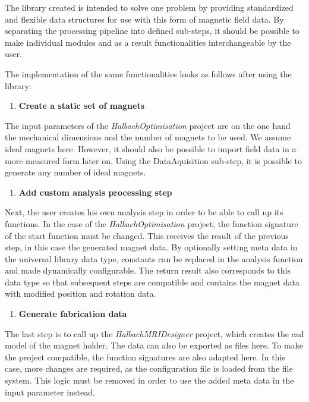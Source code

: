 The library created is intended to solve one problem by providing
standardized and flexible data structures for use with this form of
magnetic field data. By separating the processing pipeline into defined
sub-steps, it should be possible to make individual modules and as a
result functionalities interchangeable by the user.

The implementation of the same functionalities looks as follows after
using the library:

\begin{enumerate}
\def\labelenumi{\arabic{enumi}.}
\tightlist
\item
  \textbf{Create a static set of magnets}
\end{enumerate}

The input parameters of the \emph{HalbachOptimisation}
\cite{HalbachOptimisation} project are on the one hand the
mechanical dimensions and the number of magnets to be used. We assume
ideal magnets here. However, it should also be possible to import field
data in a more measured form later on. Using the DataAquisition
sub-step, it is possible to generate any number of ideal magnets.

\begin{enumerate}
\def\labelenumi{\arabic{enumi}.}
\setcounter{enumi}{1}
\tightlist
\item
  \textbf{Add custom analysis processing step}
\end{enumerate}

Next, the user creates his own analysis step in order to be able to call
up its functions. In the case of the \emph{HalbachOptimisation}
\cite{HalbachOptimisation} project, the function signature of the
start function must be changed. This receives the result of the previous
step, in this case the generated magnet data. By optionally setting meta
data in the universal library data type, constants can be replaced in
the analysis function and made dynamically configurable. The return
result also corresponds to this data type so that subsequent steps are
compatible and contains the magnet data with modified position and
rotation data.

\begin{enumerate}
\def\labelenumi{\arabic{enumi}.}
\setcounter{enumi}{2}
\tightlist
\item
  \textbf{Generate fabrication data}
\end{enumerate}

The last step is to call up the \emph{HalbachMRIDesigner}
\cite{HalbachMRIDesigner} project, which creates the \gls{cad} model
of the magnet holder. The data can also be exported as files here. To
make the project compatible, the function signatures are also adapted
here. In this case, more changes are required, as the configuration file
is loaded from the file system. This logic must be removed in order to
use the added meta data in the input parameter instead.

